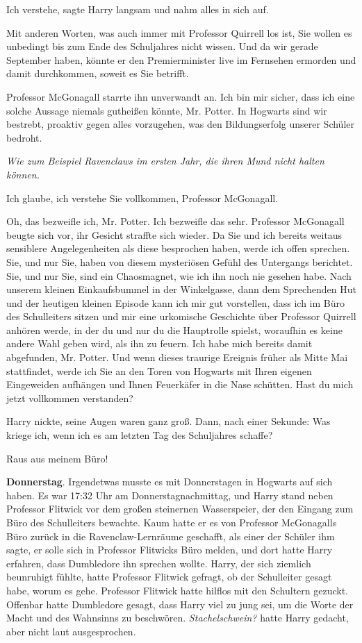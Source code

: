 \glqq{}Ich verstehe\grqq{}, sagte Harry langsam und nahm alles in sich auf.

\glqq{}Mit anderen Worten, was auch immer mit Professor Quirrell los ist, Sie
wollen es unbedingt bis zum Ende des Schuljahres nicht wissen. Und da wir gerade
September haben, könnte er den Premierminister live im Fernsehen ermorden und
damit durchkommen, soweit es Sie betrifft.\grqq{}

Professor McGonagall starrte ihn unverwandt an. \glqq{}Ich bin mir sicher, dass
ich eine solche Aussage niemals gutheißen könnte, Mr. Potter. In Hogwarts sind
wir bestrebt, proaktiv gegen alles vorzugehen, was den Bildungserfolg unserer
Schüler bedroht.\grqq{}

\emph{Wie zum Beispiel Ravenclaws im ersten Jahr, die ihren Mund nicht halten
können.}

\glqq{}Ich glaube, ich verstehe Sie vollkommen, Professor McGonagall.\grqq{}

\glqq{}Oh, das bezweifle ich, Mr. Potter. Ich bezweifle das sehr.\grqq{}
Professor McGonagall beugte sich vor, ihr Gesicht straffte sich wieder. \glqq{}Da
Sie und ich bereits weitaus sensiblere Angelegenheiten als diese besprochen
haben, werde ich offen sprechen. Sie, und nur Sie, haben von diesem mysteriösen
Gefühl des Untergangs berichtet. Sie, und nur Sie, sind ein Chaosmagnet, wie ich
ihn noch nie gesehen habe. Nach unserem kleinen Einkaufsbummel in der
Winkelgasse, dann dem Sprechenden Hut und der heutigen kleinen Episode kann ich
mir gut vorstellen, dass ich im Büro des Schulleiters sitzen und mir eine
urkomische Geschichte über Professor Quirrell anhören werde, in der du und nur
du die Hauptrolle spielst, woraufhin es keine andere Wahl geben wird, als ihn zu
feuern. Ich habe mich bereits damit abgefunden, Mr. Potter. Und wenn dieses
traurige Ereignis früher als Mitte Mai stattfindet, werde ich Sie an den Toren
von Hogwarts mit Ihren eigenen Eingeweiden aufhängen und Ihnen Feuerkäfer in die
Nase schütten. Hast du mich jetzt vollkommen verstanden?\grqq{}

Harry nickte, seine Augen waren ganz groß. Dann, nach einer Sekunde: \glqq{}Was
kriege ich, wenn ich es am letzten Tag des Schuljahres schaffe?\grqq{}

\glqq{}Raus aus meinem Büro!\grqq{}

\textbf{Donnerstag}. Irgendetwas musste es mit Donnerstagen in Hogwarts auf sich
haben. Es war 17:32 Uhr am Donnerstagnachmittag, und Harry stand neben Professor
Flitwick vor dem großen steinernen Wasserspeier, der den Eingang zum Büro des
Schulleiters bewachte. Kaum hatte er es von Professor McGonagalls Büro zurück in
die Ravenclaw-Lernräume geschafft, als einer der Schüler ihm sagte, er solle
sich in Professor Flitwicks Büro melden, und dort hatte Harry erfahren, dass
Dumbledore ihn sprechen wollte. Harry, der sich ziemlich beunruhigt fühlte,
hatte Professor Flitwick gefragt, ob der Schulleiter gesagt habe, worum es gehe.
Professor Flitwick hatte hilflos mit den Schultern gezuckt. Offenbar hatte
Dumbledore gesagt, dass Harry viel zu jung sei, um die Worte der Macht und des
Wahnsinns zu beschwören. \emph{Stachelschwein?} hatte Harry gedacht, aber nicht
laut ausgesprochen.

